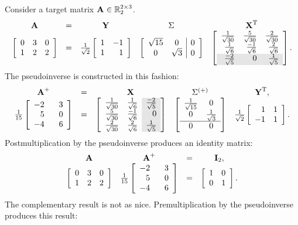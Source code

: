 Consider a target matrix $\A{}\in\real{\by{2}{3}}_{2}$.
\begin{equation*}
  \begin{array}{ccccc}
  \A{} &=& \Y{} & \sig{} & \X{T}\\
  \mat{ccc}
  {
  0 & 3 & 0 \\
  1 & 2 & 2
  } 
  &=&
  \frac{1}{\sqrt{2}}
  \mat{rr}{1 & -1\\1 & 1} &
  \mat{cc|c}
  {
  \sqrt{15} & 0 & 0 \\
  0 & \sqrt{3}  & 0
  } &
  \mat{rrr}
  {
  \frac{1}{\sqrt{30}} & \frac{5}{\sqrt{30}} & \frac{2}{\sqrt{30}}\\
  \frac{1}{\sqrt{6}} & \frac{-1}{\sqrt{6}} & \frac{2}{\sqrt{6}} \\
  \rowcolor{ltgray}
  \frac{-2}{\sqrt{5}} & 0 & \frac{1}{\sqrt{5}}
  }.
  \end{array}
\end{equation*}
The pseudoinverse is constructed in this fashion:
\begin{equation*}
  \begin{array}{ccccc}
    \Ap &=& \X{} & \index{Sigma matrix!inverse}\sig{(+)} & \Y{T}, \\
    \frac{1}{15}\mat{rr}{-2&\phantom{-}3\\5&0\\-4&6} &=& 
    \mat{rr>{\columncolor{ltgray}}r}{\frac{1}{\sqrt{30}}&\frac{1}{\sqrt{6}}&\frac{-2}{\sqrt{5}}\\\frac{5}{\sqrt{30}}&\frac{-1}{\sqrt{6}}&0\\\frac{2}{\sqrt{30}}&\frac{2}{\sqrt{6}}&\frac{1}{\sqrt{5}}} & 
    \mat{cc}{\frac{1}{\sqrt{15}}&0\\0&\frac{1}{\sqrt{3}}\\\hline0&0} & 
    \frac{1}{\sqrt{2}}\mat{rr}{1&1\\-1&1}.
  \end{array}
\end{equation*}
Postmultiplication by the pseudoinverse produces an identity matrix:
\begin{equation*}
  \begin{array}{cccc}
    \A{}&\Ap&=&\I{2},\\
\mat{ccc}
  {
  0 & 3 & 0 \\
  1 & 2 & 2
  } &
   \frac{1}{15}\mat{rr}{-2&\phantom{-}3\\5&0\\-4&6} &=&
   \itwo.
  \end{array}
\end{equation*}
The complementary result is not as nice. Premultiplication by the pseudoinverse produces this result:
